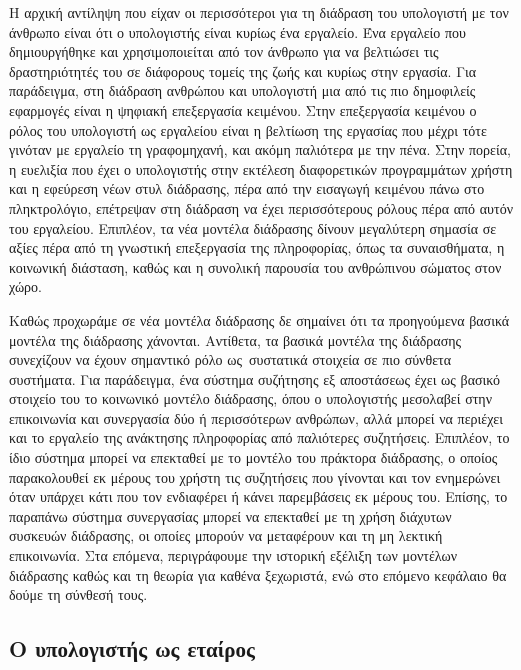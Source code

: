 \documentclass[
]{article}
\begin{document}
Η αρχική αντίληψη που είχαν οι περισσότεροι για τη διάδραση του
υπολογιστή με τον άνθρωπο είναι ότι ο υπολογιστής είναι κυρίως ένα
εργαλείο. Ένα εργαλείο που δημιουργήθηκε και χρησιμοποιείται από τον
άνθρωπο για να βελτιώσει τις δραστηριότητές του σε διάφορους τομείς της
ζωής και κυρίως στην εργασία. Για παράδειγμα, στη διάδραση ανθρώπου και
υπολογιστή μια από τις πιο δημοφιλείς εφαρμογές είναι η ψηφιακή
επεξεργασία κειμένου. Στην επεξεργασία κειμένου ο ρόλος του υπολογιστή
ως εργαλείου είναι η βελτίωση της εργασίας που μέχρι τότε γινόταν με
εργαλείο τη γραφομηχανή, και ακόμη παλιότερα με την πένα. Στην πορεία, η
ευελιξία που έχει ο υπολογιστής στην εκτέλεση διαφορετικών προγραμμάτων
χρήστη και η εφεύρεση νέων στυλ διάδρασης, πέρα από την εισαγωγή
κειμένου πάνω στο πληκτρολόγιο, επέτρεψαν στη διάδραση να έχει
περισσότερους ρόλους πέρα από αυτόν του εργαλείου. Επιπλέον, τα νέα
μοντέλα διάδρασης δίνουν μεγαλύτερη σημασία σε αξίες πέρα από τη
γνωστική επεξεργασία της πληροφορίας, όπως τα συναισθήματα, η κοινωνική
διάσταση, καθώς και η συνολική παρουσία του ανθρώπινου σώματος στον
χώρο.

Καθώς προχωράμε σε νέα μοντέλα διάδρασης δε σημαίνει ότι τα προηγούμενα
βασικά μοντέλα της διάδρασης χάνονται. Αντίθετα, τα βασικά μοντέλα της
διάδρασης συνεχίζουν να έχουν σημαντικό ρόλο ως~συστατικά στοιχεία σε
πιο σύνθετα συστήματα. Για παράδειγμα, ένα σύστημα συζήτησης εξ
αποστάσεως έχει ως βασικό στοιχείο του το κοινωνικό μοντέλο διάδρασης,
όπου ο υπολογιστής μεσολαβεί στην επικοινωνία και συνεργασία δύο ή
περισσότερων ανθρώπων, αλλά μπορεί να περιέχει και το εργαλείο της
ανάκτησης πληροφορίας από παλιότερες συζητήσεις. Επιπλέον, το ίδιο
σύστημα μπορεί να επεκταθεί με το μοντέλο του πράκτορα διάδρασης, ο
οποίος παρακολουθεί εκ μέρους του χρήστη τις συζητήσεις που γίνονται και
τον ενημερώνει όταν υπάρχει κάτι που τον ενδιαφέρει ή κάνει παρεμβάσεις
εκ μέρους του. Επίσης, το παραπάνω σύστημα συνεργασίας μπορεί να
επεκταθεί με τη χρήση διάχυτων συσκευών διάδρασης, οι οποίες μπορούν να
μεταφέρουν και τη μη λεκτική επικοινωνία. Στα επόμενα, περιγράφουμε την
ιστορική εξέλιξη των μοντέλων διάδρασης καθώς και τη θεωρία για καθένα
ξεχωριστά, ενώ στο επόμενο κεφάλαιο θα δούμε τη σύνθεσή τους.

\hypertarget{ux3bf-ux3c5ux3c0ux3bfux3bbux3bfux3b3ux3b9ux3c3ux3c4ux3aeux3c2-ux3c9ux3c2-ux3b5ux3c4ux3b1ux3afux3c1ux3bfux3c2}{%
\subsection{Ο υπολογιστής ως
εταίρος}\label{ux3bf-ux3c5ux3c0ux3bfux3bbux3bfux3b3ux3b9ux3c3ux3c4ux3aeux3c2-ux3c9ux3c2-ux3b5ux3c4ux3b1ux3afux3c1ux3bfux3c2}}
\end{document}
